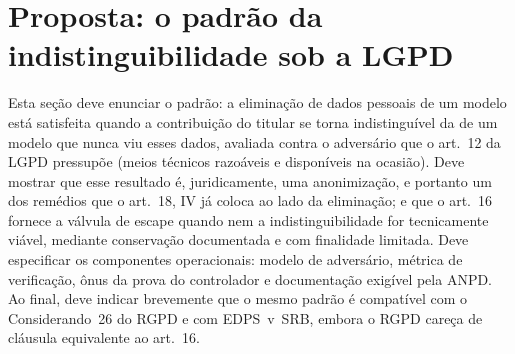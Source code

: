 \section{Proposta: o padrão da indistinguibilidade sob a LGPD}


Esta seção deve enunciar o padrão: a eliminação de dados pessoais de um
modelo está satisfeita quando a contribuição do titular se torna
indistinguível da de um modelo que nunca viu esses dados, avaliada contra o
adversário que o art.~12 da LGPD pressupõe (meios técnicos razoáveis e
disponíveis na ocasião). Deve mostrar que esse resultado é, juridicamente,
uma anonimização, e portanto um dos remédios que o art.~18, IV já coloca ao
lado da eliminação; e que o art.~16 fornece a válvula de escape quando nem
a indistinguibilidade for tecnicamente viável, mediante conservação
documentada e com finalidade limitada. Deve especificar os componentes
operacionais: modelo de adversário, métrica de verificação, ônus da prova
do controlador e documentação exigível pela ANPD. Ao final, deve indicar
brevemente que o mesmo padrão é compatível com o Considerando~26 do RGPD e
com EDPS~v~SRB, embora o RGPD careça de cláusula equivalente ao art.~16.

